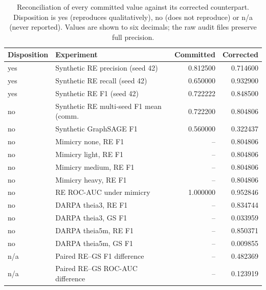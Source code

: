 \begin{table}[t]
\centering
\caption{Reconciliation of every committed value against its corrected counterpart. Disposition is yes (reproduces qualitatively), no (does not reproduce) or n/a (never reported). Values are shown to six decimals; the raw audit files preserve full precision.}
\label{tab:reconciliation}
{\small
\begin{tabular}{lp{5.6cm}rr}
\toprule
Disposition & Experiment & Committed & Corrected \\
\midrule
yes & Synthetic RE precision (seed 42) & 0.812500 & 0.714600 \\
yes & Synthetic RE recall (seed 42) & 0.650000 & 0.932900 \\
yes & Synthetic RE F1 (seed 42) & 0.722222 & 0.848500 \\
no & Synthetic RE multi-seed F1 mean (comm. & 0.722200 & 0.804806 \\
no & Synthetic GraphSAGE F1 & 0.560000 & 0.322437 \\
no & Mimicry none, RE F1 & -- & 0.804806 \\
no & Mimicry light, RE F1 & -- & 0.804806 \\
no & Mimicry medium, RE F1 & -- & 0.804806 \\
no & Mimicry heavy, RE F1 & -- & 0.804806 \\
no & RE ROC-AUC under mimicry & 1.000000 & 0.952846 \\
no & DARPA theia3, RE F1 & -- & 0.834744 \\
no & DARPA theia3, GS F1 & -- & 0.033959 \\
no & DARPA theia5m, RE F1 & -- & 0.850371 \\
no & DARPA theia5m, GS F1 & -- & 0.009855 \\
n/a & Paired RE--GS F1 difference & -- & 0.482369 \\
n/a & Paired RE--GS ROC-AUC difference & -- & 0.123919 \\
\bottomrule
\end{tabular}
}
\end{table}
